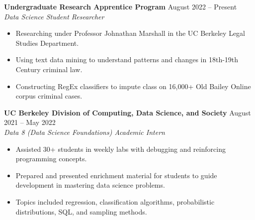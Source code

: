 \documentclass{article}
\begin{document}
    \begin{adjustwidth}{1em}{1em}


        \textbf{Undergraduate Research Apprentice Program} \hfill August 2022 -- Present
        \\ \textit{Data Science Student Researcher}
        \begin{itemize}
            \item Researching under Professor Johnathan Marshall in the UC Berkeley Legal Studies Department.
            \item Using text data mining to understand patterns and changes in 18th-19th Century criminal law.
            \item Constructing RegEx classifiers to impute class on 16,000+ Old Bailey Online corpus criminal cases.
        \end{itemize}

        \vspace{1mm}

        \textbf{UC Berkeley Division of Computing, Data Science, and Society} \hfill August 2021 -- May 2022
        \\ \textit{Data 8 (Data Science Foundations) Academic Intern}
        \begin{itemize}
            \item Assisted 30+ students in weekly labs with debugging and reinforcing programming concepts.
            \item Prepared and presented enrichment material for students to guide development in mastering data science problems.
            \item Topics included regression, classification algorithms, probabilistic distributions, SQL, and sampling methods.
        \end{itemize}


        
    \end{adjustwidth}
\end{document}
